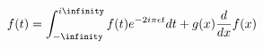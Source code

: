 \documentclass[preview]{standalone}
\begin{document}
\begin{align*}
f(t)= \int^{i \infinity}_{- \infinity} f(t) e^{-2 i \pi \epsilon t}dt + g(x)\frac{d}{dx}f(x)
\end{align*}
\end{document}
